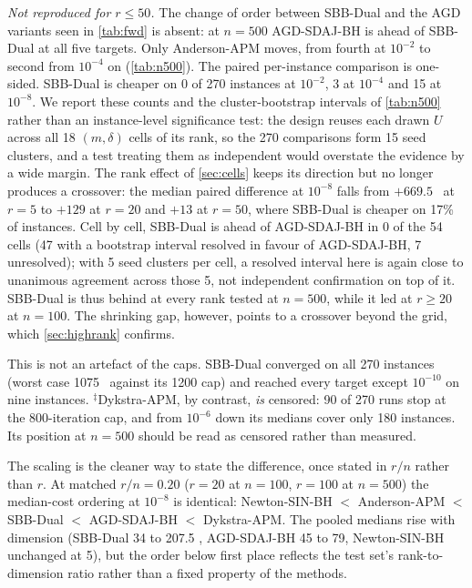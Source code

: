 \emph{Not reproduced for $r\le50$.} The change of order between SBB-Dual and
the AGD variants seen in \cref{tab:fwd} is absent: at $n=500$ AGD-SDAJ-BH is
ahead of SBB-Dual at all five targets. Only Anderson-APM moves, from fourth
at $10^{-2}$ to second from $10^{-4}$ on (\cref{tab:n500}). The paired
per-instance comparison is one-sided. SBB-Dual is cheaper on 0 of 270
instances at $10^{-2}$, 3 at $10^{-4}$ and 15 at $10^{-8}$. We report
these counts and the cluster-bootstrap intervals of \cref{tab:n500} rather
than an instance-level significance test: the design reuses each drawn $U$
across all 18 $(m,\delta)$ cells of its rank, so the 270 comparisons form 15
seed clusters, and a test treating them as independent would overstate
the evidence by a wide margin. The rank effect of \cref{sec:cells} keeps its
direction but no longer produces a crossover: the median paired difference at
$10^{-8}$ falls from $+669.5$ \EVDs\ at $r=5$ to $+129$ at $r=20$ and $+13$ at
$r=50$, where SBB-Dual is cheaper on 17\% of instances. Cell by cell, SBB-Dual
is ahead of AGD-SDAJ-BH in 0 of the 54 cells (47 with a bootstrap interval
resolved in favour of AGD-SDAJ-BH, 7 unresolved); with 5 seed
clusters per cell, a resolved interval here is again close to unanimous
agreement across those 5, not independent confirmation on top of it. SBB-Dual is thus
behind at every rank tested at $n=500$, while it led at $r\ge20$ at $n=100$.
The shrinking gap, however, points to a crossover beyond the grid, which
\cref{sec:highrank} confirms.

This is not an artefact of the caps. SBB-Dual converged on all 270 instances
(worst case 1075 \EVDs\ against its 1200 cap) and reached every target except
$10^{-10}$ on nine instances. $^{\ddagger}$Dykstra-APM, by contrast, \emph{is}
censored: 90 of 270 runs stop at the 800-iteration cap, and from $10^{-6}$
down its medians cover only 180 instances. Its position at $n=500$ should be
read as censored rather than measured.

The scaling is the cleaner way to state the difference, once stated in $r/n$
rather than $r$. At matched $r/n=0.20$ ($r=20$ at $n=100$, $r=100$ at $n=500$)
the median-cost ordering at $10^{-8}$ is identical: Newton-SIN-BH $<$
Anderson-APM $<$ SBB-Dual $<$ AGD-SDAJ-BH $<$ Dykstra-APM. The pooled medians
rise with dimension (SBB-Dual 34 to 207.5 \EVDs, AGD-SDAJ-BH 45 to 79,
Newton-SIN-BH unchanged at 5), but the order below first place reflects the
test set's rank-to-dimension ratio rather than a fixed property of the
methods.

